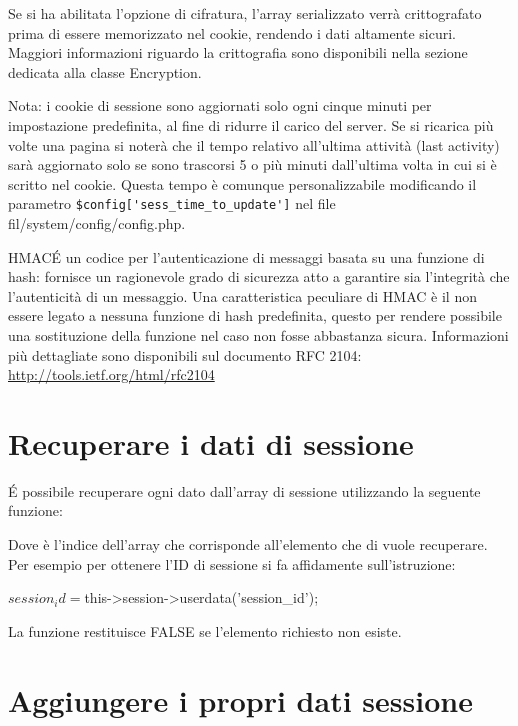 Se si ha abilitata l'opzione di cifratura, l'array serializzato verrà crittografato prima di essere memorizzato nel cookie, rendendo i dati altamente sicuri. Maggiori informazioni riguardo la crittografia sono disponibili nella sezione dedicata alla classe Encryption.

Nota: i cookie di sessione sono aggiornati solo ogni cinque minuti per impostazione predefinita, al fine di ridurre il carico del server. Se si ricarica più volte una pagina si noterà che il tempo relativo all'ultima attività (last activity) sarà aggiornato solo se sono trascorsi 5 o più minuti dall'ultima volta in cui si è scritto nel cookie. Questa tempo è comunque personalizzabile modificando il parametro \verb|$config['sess_time_to_update']| nel file fil{/system/config/config.php}.

\begin{deftabv}{HMAC}{\'E un codice per l'autenticazione di messaggi basata su una funzione di hash: fornisce un ragionevole grado di sicurezza atto a garantire sia l'integrità che l'autenticità di un messaggio. Una caratteristica peculiare di HMAC è il non essere legato a nessuna funzione di hash predefinita, questo per rendere possibile una sostituzione della funzione nel caso non fosse abbastanza sicura. Informazioni più dettagliate sono disponibili sul documento RFC 2104: \url{http://tools.ietf.org/html/rfc2104}}
\end{deftabv}

\section*{Recuperare i dati di sessione}

\'E possibile recuperare ogni dato dall'array di sessione utilizzando la seguente funzione:


Dove  è l'indice dell'array che corrisponde all'elemento che di vuole recuperare. Per esempio per ottenere l'ID di sessione si fa affidamente sull'istruzione:

\begin{code}
$session_id = $this->session->userdata('session_id');
\end{code}

La funzione restituisce FALSE se l'elemento richiesto non esiste.

\section*{Aggiungere i propri dati sessione}


